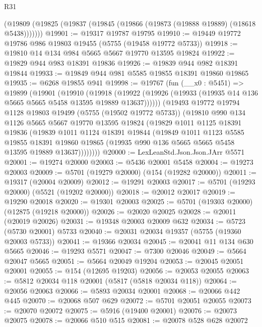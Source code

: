 \begin{lexlean}{R31}
\begin{coremodule}
    (@19809 (@19825 (@19837 (@19845 (@19866 (@19873 (@19888 @19889) (@18618 @5438)))))))
@19901 := @19317 @19787 @19795
@19910 := @19449 @19772 @19786 @986 @19803 @19455 (@5755 (@19458 @19772 @5733))
@19918 := @19810 @14 @134 @984 @5665 @5667 @19770 @13595 @19824
@19922 := @19829 @944 @983 @18391 @19836
@19926 := @19839 @944 @982 @18391 @19844
@19933 := @19849 @944 @981 @5585 @19855 @18391 @19860 @19865
@19935 := @6268 @19855 @941
@19998 := @19767
    (fun (__x0 : @5451) =>
    @19899
      (@19901
        (@19910
          (@19918
            (@19922 (@19926 (@19933 (@19935 @14 @136 @5665 @5665 @5458 @13595 @19889 @13637))))))
        (@19493
          @19772
          @19794
          @1128
          @19803
          @19499
          (@5755 (@19502 @19772 @5733))
          (@19810
            @990
            @134
            @1126
            @5665
            @5667
            @19770
            @13595
            @19824
            (@19829
              @1011
              @1125
              @18391
              @19836
              (@19839
                @1011
                @1124
                @18391
                @19844
                (@19849
                  @1011
                  @1123
                  @5585
                  @19855
                  @18391
                  @19860
                  @19865
                  (@19935 @990 @136 @5665 @5665 @5458 @13595 @19889 @13637))))))))
@20000 := LexLeanStd.Json.Json.JArr @5571
@20001 := @19274 @20000
@20003 := @5436 @20001 @5458
@20004 := @19273 @20003
@20009 := @5701 (@19279 @20000) (@154 (@19282 @20000))
@20011 := @19317 (@20004 @20009)
@20012 := @19291 @20003
@20017 := @5701 (@19293 @20000) (@5521 (@19202 @20000))
@20018 := @20012 @20017
@20019 := @19290 @20018
@20020 := @19301 @20003
@20025 := @5701 (@19303 @20000) (@12875 (@19218 @20000))
@20026 := @20020 @20025
@20028 := @20011 (@20019 @20026)
@20031 := @19348 @20003 @20009 @632
@20034 := @5723 (@5730 @20001) @5733
@20040 := @20031 @20034 @19357 (@5755 (@19360 @20003 @5733))
@20041 := @19366 @20034
@20045 := @20041 @11 @134 @630 @5665
@20046 := @19293 @5571
@20047 := @7300 @20046
@20049 := @5664 @20047 @5665
@20051 := @5664 @20049 @19204
@20053 := @20045 @20051 @20001
@20055 := @154 (@12695 @19203)
@20056 := @20053 @20055
@20063 := @5812 @20034 @118 @20001 (@5817 (@5818 @20034 @118))
@20064 := @20056 @20063
@20066 := @5893 @20034 @20001
@20068 := @20066 @442 @445
@20070 := @20068 @507 @629
@20072 := @5701 @20051 @20055
@20073 := @20070 @20072
@20075 := @5916 (@19400 @20001)
@20076 := @20073 @20075
@20078 := @20066 @510 @515
@20081 := @20078 @528 @628 @20072

\end{coremodule}
\end{lexlean}
